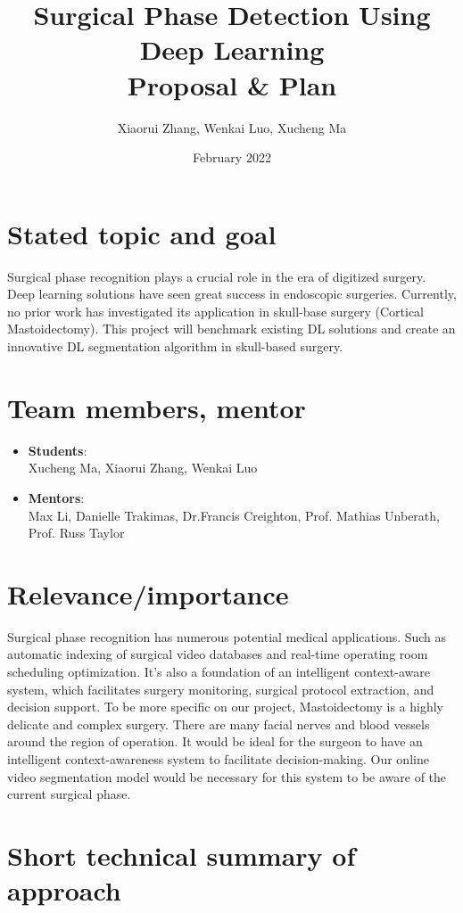 \documentclass[11pt]{article} \usepackage[top=1in, bottom=1in, left=1in, right=1in]{geometry}
\title{Surgical Phase Detection Using Deep Learning\\ Proposal \& Plan}
\author{Xiaorui Zhang, Wenkai Luo, Xucheng Ma}
\date{February 2022}
\begin{document}
\maketitle

\section{Stated topic and goal}
Surgical phase recognition plays a crucial role in the era of digitized surgery. Deep learning solutions have seen great success in endoscopic surgeries. Currently, no prior work has investigated its application in skull-base surgery (Cortical Mastoidectomy). This project will benchmark existing DL solutions and create an innovative DL segmentation algorithm in skull-based surgery.

\section{Team members, mentor}
\begin{itemize}
    \item \textbf{Students}:\\Xucheng Ma, Xiaorui Zhang, Wenkai Luo
    \item \textbf{Mentors}:\\Max Li, Danielle Trakimas, Dr.Francis Creighton, Prof. Mathias Unberath, Prof. Russ Taylor
\end{itemize}

\section{Relevance/importance}
Surgical phase recognition has numerous potential medical applications. Such as automatic indexing of surgical video databases and real-time operating room scheduling optimization. It’s also a foundation of an intelligent context-aware system, which facilitates surgery monitoring, surgical protocol extraction, and decision support. To be more specific on our project, Mastoidectomy is a highly delicate and complex surgery. There are many facial nerves and blood vessels around the region of operation. It would be ideal for the surgeon to have an intelligent context-awareness system to facilitate decision-making. Our online video segmentation model would be necessary for this system to be aware of the current surgical phase. 
\section{Short technical summary of approach}
\end{document}
